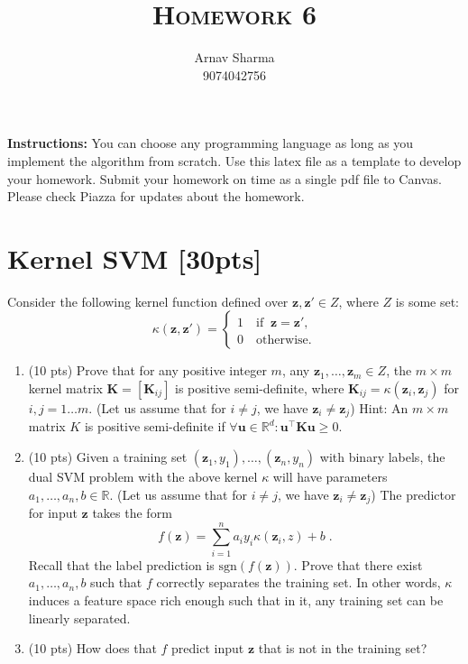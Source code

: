 \documentclass[a4paper]{article}
\title{\textsc{Homework 6}} %
\author{
Arnav Sharma\\
9074042756\\
}
\date{}
\theoremstyle{definition}
\def\R{\mathbb R}
\begin{document}
\maketitle 


\textbf{Instructions:} 
You can choose any programming language as long as you implement the algorithm from scratch. Use this latex file as a template to develop your homework.
Submit your homework on time as a single pdf file to Canvas.
Please check Piazza for updates about the homework.\\


\section{Kernel SVM [30pts]}
Consider the following kernel function defined over $\mathbf z,\mathbf z'\in Z$, where $Z$ is some set:
\[
\kappa(\mathbf z,\mathbf z')=\begin{cases}
    1 \quad \mathrm{if }\;\; \mathbf z=\mathbf z',\\
0\quad \mathrm{otherwise}.
\end{cases}
\]
\begin{enumerate}
    \item (10 pts) Prove that for any positive integer $m$, any $\mathbf z_1, \ldots,\mathbf z_m \in Z$, the $m\times m$ kernel matrix $\mathbf K = [\mathbf K_{ij} ]$ is
positive semi-definite, where $\mathbf K_{ij} = \kappa(\mathbf z_i
, \mathbf z_j )$ for $i, j = 1 \ldots m$. (Let us assume that for $i \neq j$, we have
$\mathbf z_i \neq \mathbf z_j$) Hint: An  $m\times m$  matrix $K $ is positive semi-definite if  $\forall \mathbf u\in \R^d: \mathbf u^\top \mathbf K\mathbf u\geq 0$.
\item (10 pts) Given a training set $(\mathbf z_1, y_1), \ldots,(\mathbf z_n, y_n)$ with binary labels, the dual SVM problem with the above
kernel $\kappa$ will have parameters $a_1, \ldots, a_n,b \in \R$. (Let us assume that for $i \neq j$, we have
$\mathbf z_i \neq \mathbf z_j$) The predictor
for input $\mathbf z$ takes the form
\[
f(\mathbf z)=\sum_{i=1}^na_iy_i\kappa(\mathbf z_i,z) +b\;.
\]
Recall that the label prediction is $\mathrm{sgn}(f(\mathbf z))$. Prove that there exist $a_1, \ldots, a_n, b$ such that $f$ correctly separates
the training set. In other words, $\kappa$ induces a feature space rich enough such that in it, any training set can be linearly separated.
\item (10 pts) How does that $f$ predict input $\mathbf z$ that is not in the training set?
\end{enumerate}
\end{document}
